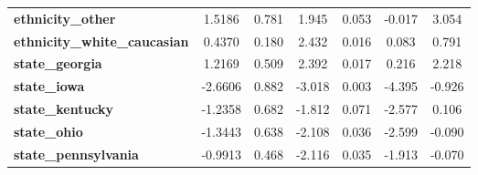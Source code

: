 {\begin{tabular}{lcccccc}
\textbf{ethnicity\_other}                          &       1.5186  &        0.781     &     1.945  &         0.053        &       -0.017    &        3.054     \\
\textbf{ethnicity\_white\_caucasian}               &       0.4370  &        0.180     &     2.432  &         0.016        &        0.083    &        0.791     \\
\textbf{state\_georgia}                            &       1.2169  &        0.509     &     2.392  &         0.017        &        0.216    &        2.218     \\
\textbf{state\_iowa}                               &      -2.6606  &        0.882     &    -3.018  &         0.003        &       -4.395    &       -0.926     \\
\textbf{state\_kentucky}                           &      -1.2358  &        0.682     &    -1.812  &         0.071        &       -2.577    &        0.106     \\
\textbf{state\_ohio}                               &      -1.3443  &        0.638     &    -2.108  &         0.036        &       -2.599    &       -0.090     \\
\textbf{state\_pennsylvania}                       &      -0.9913  &        0.468     &    -2.116  &         0.035        &       -1.913    &       -0.070     \\
\bottomrule
\end{tabular}
}
